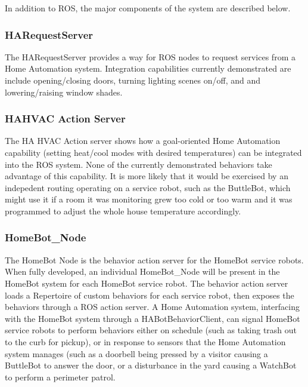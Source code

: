 In addition to R\-O\-S, the major components of the system are described below.

\subsubsection*{H\-A\-Request\-Server}

The H\-A\-Request\-Server provides a way for R\-O\-S nodes to request services from a Home Automation system. Integration capabilities currently demonstrated are include opening/closing doors, turning lighting scenes on/off, and and lowering/raising window shades.

\subsubsection*{H\-A\-H\-V\-A\-C Action Server}

The H\-A H\-V\-A\-C Action server shows how a goal-\/oriented Home Automation capability (setting heat/cool modes with desired temperatures) can be integrated into the R\-O\-S system. None of the currently demonstrated behaviors take advantage of this capability. It is more likely that it would be exercised by an indepedent routing operating on a service robot, such as the Buttle\-Bot, which might use it if a room it was monitoring grew too cold or too warm and it was programmed to adjust the whole house temperature accordingly.

\subsubsection*{Home\-Bot\-\_\-\-Node}

The Home\-Bot Node is the behavior action server for the Home\-Bot service robots. When fully developed, an individual Home\-Bot\-\_\-\-Node will be present in the Home\-Bot system for each Home\-Bot service robot. The behavior action server loads a Repertoire of custom behaviors for each service robot, then exposes the behaviors through a R\-O\-S action server. A Home Automation system, interfacing with the Home\-Bot system through a H\-A\-Bot\-Behavior\-Client, can signal Home\-Bot service robots to perform behaviors either on schedule (such as taking trash out to the curb for pickup), or in response to sensors that the Home Automation system manages (such as a doorbell being pressed by a visitor causing a Buttle\-Bot to answer the door, or a disturbance in the yard causing a Watch\-Bot to perform a perimeter patrol.

